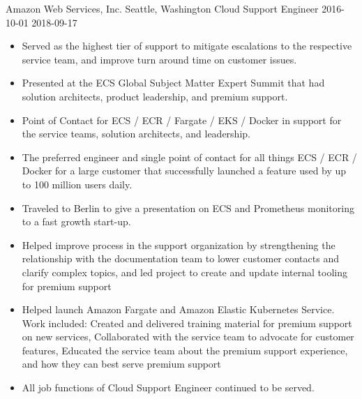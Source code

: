 \roleheader
    {Amazon Web Services, Inc.}
    {Seattle, Washington}
    {Cloud Support Engineer }
    {2016-10-01}
    {2018-09-17}

\begin{itemize}
    \item Served as the highest tier of support to mitigate escalations to the respective service team, and improve turn around time on customer issues.
    \item Presented at the ECS Global Subject Matter Expert Summit that had solution architects, product leadership, and premium support.
    \item Point of Contact for ECS / ECR / Fargate / EKS / Docker in support for the service teams, solution architects, and leadership.
    \item The preferred engineer and single point of contact for all things ECS / ECR / Docker for a large customer that successfully launched a feature used by up to 100 million users daily.
    \item Traveled to Berlin to give a presentation on ECS and Prometheus monitoring to a fast growth start-up.
    \item Helped improve process in the support organization by strengthening the relationship with the documentation team to lower customer contacts and clarify complex topics, and led project to create and update internal tooling for premium support
    \item Helped launch Amazon Fargate and Amazon Elastic Kubernetes Service. Work included: Created and delivered training material for premium support on new services, Collaborated with the service team to advocate for customer features, Educated the service team about the premium support experience, and how they can best serve premium support
    \item All job functions of Cloud Support Engineer  continued to be served.
\end{itemize}